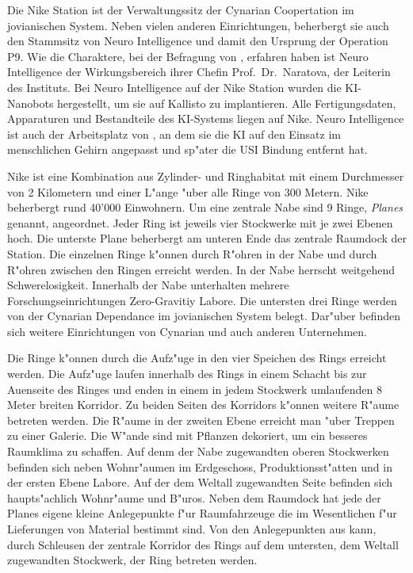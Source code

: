 
Die Nike Station ist der Verwaltungssitz der Cynarian Coopertation im jovianischen System. Neben vielen anderen Einrichtungen, beherbergt sie auch den Stammsitz von Neuro Intelligence und damit den Ursprung der Operation P9. Wie die Charaktere, bei der Befragung von \ml{}, erfahren haben ist Neuro Intelligence der Wirkungsbereich ihrer Chefin Prof.~Dr.~Naratova, der Leiterin des Instituts. Bei Neuro Intelligence auf der Nike Station wurden die KI-Nanobots hergestellt, um sie auf Kallisto zu implantieren. Alle Fertigungsdaten, Apparaturen und Bestandteile des KI-Systems liegen auf Nike. Neuro Intelligence ist auch der Arbeitsplatz von \ml{}, an dem sie die KI auf den Einsatz im menschlichen Gehirn angepasst und sp"ater die USI Bindung entfernt hat.

Nike ist eine Kombination aus Zylinder- und Ringhabitat mit einem Durchmesser von 2 Kilometern und einer L"ange "uber alle Ringe von 300 Metern. Nike beherbergt rund 40'000 Einwohnern. Um eine zentrale Nabe sind 9 Ringe, \emph{Planes} genannt, angeordnet. Jeder Ring ist jeweils vier Stockwerke mit je zwei Ebenen hoch. Die unterste Plane beherbergt am unteren Ende das zentrale Raumdock der Station.  Die einzelnen Ringe k"onnen durch R"ohren in der Nabe und durch R"ohren zwischen den Ringen erreicht werden. In der Nabe herrscht weitgehend Schwerelosigkeit. Innerhalb der Nabe unterhalten mehrere Forschungseinrichtungen Zero-Gravitiy Labore. Die untersten drei Ringe werden von der Cynarian Dependance im jovianischen System belegt. Dar"uber befinden sich weitere Einrichtungen von Cynarian und auch anderen Unternehmen.

Die Ringe k"onnen durch die Aufz"uge in den vier Speichen des Rings erreicht werden. Die Aufz"uge laufen innerhalb des Rings in einem Schacht bis zur Au\3enseite des Ringes und enden in einem in jedem Stockwerk umlaufenden 8 Meter breiten Korridor. Zu beiden Seiten des Korridors k"onnen weitere R"aume betreten werden. Die R"aume in der zweiten Ebene erreicht man "uber Treppen zu einer Galerie. Die W"ande sind mit Pflanzen dekoriert, um ein besseres Raumklima zu schaffen. Auf denm der Nabe zugewandten oberen Stockwerken befinden sich neben Wohnr"aumen im Erdgeschoss, Produktionsst"atten und in der ersten Ebene Labore. Auf der dem Weltall zugewandten Seite befinden sich haupts"achlich Wohnr"aume und B"uros. Neben dem Raumdock hat jede der Planes eigene kleine Anlegepunkte f"ur Raumfahrzeuge die im Wesentlichen f"ur Lieferungen von Material bestimmt sind. Von den Anlegepunkten aus kann, durch Schleusen der zentrale Korridor des Rings auf dem untersten, dem Weltall zugewandten Stockwerk, der Ring betreten werden.

